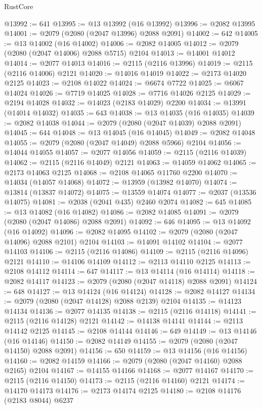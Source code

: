 \begin{lexlean}{RustCore}
\begin{coremodule}
@13992 := 641
@13995 := @13 @13992 (@16 @13992)
@13996 := @2082 @13995
@14001 := @2079 (@2080 (@2047 @13996) @2088 @2091)
@14002 := 642
@14005 := @13 @14002 (@16 @14002)
@14006 := @2082 @14005
@14012 := @2079 (@2080 (@2047 @14006) @2088 @5715) @2104
@14013 := @14001 @14012
@14014 := @2077 @14013
@14016 := @2115 (@2116 @13996)
@14019 := @2115 (@2116 @14006) @2121
@14020 := @14016 @14019
@14022 := @2173 @14020 @2125
@14023 := @2108 @14022
@14024 := @6674 @7722
@14025 := @6067 @14024
@14026 := @7719 @14025
@14028 := @7716 @14026 @2125
@14029 := @2194 @14028
@14032 := @14023 (@2183 @14029) @2200
@14034 := @13991 (@14014 @14032)
@14035 := 643
@14038 := @13 @14035 (@16 @14035)
@14039 := @2082 @14038
@14044 := @2079 (@2080 (@2047 @14039) @2088 @2091)
@14045 := 644
@14048 := @13 @14045 (@16 @14045)
@14049 := @2082 @14048
@14055 := @2079 (@2080 (@2047 @14049) @2088 @5966) @2104
@14056 := @14044 @14055
@14057 := @2077 @14056
@14059 := @2115 (@2116 @14039)
@14062 := @2115 (@2116 @14049) @2121
@14063 := @14059 @14062
@14065 := @2173 @14063 @2125
@14068 := @2108 @14065 @11760 @2200
@14070 := @14034 (@14057 @14068)
@14072 := @13959 (@13982 @14070)
@14074 := @13814 (@13837 @14072)
@14075 := @13559 @14074
@14077 := @2037 (@13536 @14075)
@14081 := @2038 (@2041 @435) @2460 @2074
@14082 := 645
@14085 := @13 @14082 (@16 @14082)
@14086 := @2082 @14085
@14091 := @2079 (@2080 (@2047 @14086) @2088 @2091)
@14092 := 646
@14095 := @13 @14092 (@16 @14092)
@14096 := @2082 @14095
@14102 := @2079 (@2080 (@2047 @14096) @2088 @2101) @2104
@14103 := @14091 @14102
@14104 := @2077 @14103
@14106 := @2115 (@2116 @14086)
@14109 := @2115 (@2116 @14096) @2121
@14110 := @14106 @14109
@14112 := @2113 @14110 @2125
@14113 := @2108 @14112
@14114 := 647
@14117 := @13 @14114 (@16 @14114)
@14118 := @2082 @14117
@14123 := @2079 (@2080 (@2047 @14118) @2088 @2091)
@14124 := 648
@14127 := @13 @14124 (@16 @14124)
@14128 := @2082 @14127
@14134 := @2079 (@2080 (@2047 @14128) @2088 @2139) @2104
@14135 := @14123 @14134
@14136 := @2077 @14135
@14138 := @2115 (@2116 @14118)
@14141 := @2115 (@2116 @14128) @2121
@14142 := @14138 @14141
@14144 := @2113 @14142 @2125
@14145 := @2108 @14144
@14146 := 649
@14149 := @13 @14146 (@16 @14146)
@14150 := @2082 @14149
@14155 := @2079 (@2080 (@2047 @14150) @2088 @2091)
@14156 := 650
@14159 := @13 @14156 (@16 @14156)
@14160 := @2082 @14159
@14166 := @2079 (@2080 (@2047 @14160) @2088 @2165) @2104
@14167 := @14155 @14166
@14168 := @2077 @14167
@14170 := @2115 (@2116 @14150)
@14173 := @2115 (@2116 @14160) @2121
@14174 := @14170 @14173
@14176 := @2173 @14174 @2125
@14180 := @2108 @14176 (@2183 @8044) @6237

\end{coremodule}
\end{lexlean}
